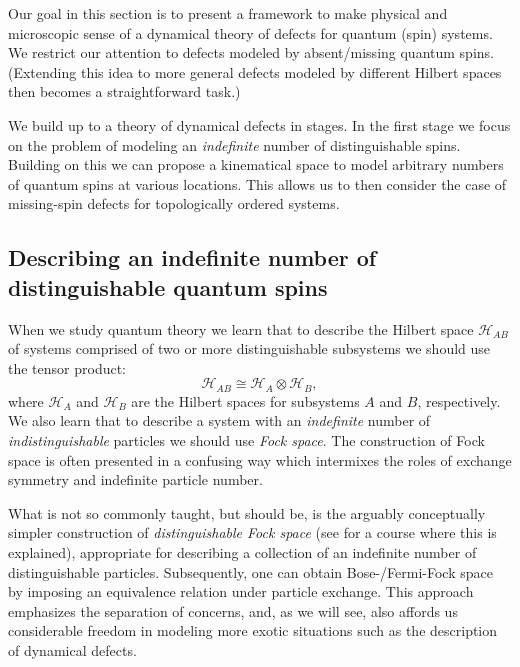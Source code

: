 \label{Gauging}

Our goal in this section is to present a framework to make physical and microscopic sense of a dynamical theory of defects for quantum (spin) systems. We restrict our attention to defects modeled by absent/missing quantum spins. (Extending this idea to more general defects modeled by different Hilbert spaces then becomes a straightforward task.)

We build up to a theory of dynamical defects in stages. In the first stage we focus on the problem of modeling an \emph{indefinite} number of distinguishable spins. Building on this we can propose a kinematical space to model arbitrary numbers of quantum spins at various locations. This allows us to then consider the case of missing-spin defects for topologically ordered systems.

\subsection{Describing an indefinite number of distinguishable quantum spins}

When we study quantum theory we learn that to describe the Hilbert space $\mathcal{H}_{AB}$ of systems comprised of two or more distinguishable subsystems we should use the tensor product:
\begin{equation}
	\mathcal{H}_{AB} \cong \mathcal{H}_A\otimes \mathcal{H}_B,
\end{equation}
where $\mathcal{H}_A$ and $\mathcal{H}_B$ are the Hilbert spaces for subsystems $A$ and $B$, respectively. We also learn that to describe a system with an \emph{indefinite} number of \emph{indistinguishable} particles we should use \emph{Fock space}. The construction of Fock space is often presented in a confusing way which intermixes the roles of exchange symmetry and indefinite particle number.

What is not so commonly taught, but should be, is the arguably conceptually simpler construction of \emph{distinguishable Fock space} (see \cite{OsborneVideoLectureAQT} for a course where this is explained), appropriate for describing a collection of an indefinite number of distinguishable particles. Subsequently, one can obtain Bose-/Fermi-Fock space by imposing an equivalence relation under particle exchange. This approach emphasizes the separation of concerns, and, as we will see, also affords us considerable freedom in modeling more exotic situations such as the description of dynamical defects.

